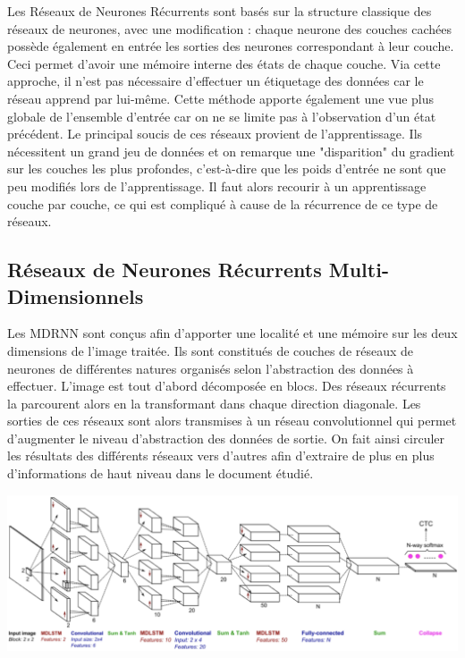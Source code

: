 Les Réseaux de Neurones Récurrents sont basés sur la structure classique des réseaux de neurones,
avec une modification : chaque neurone des couches cachées possède également en entrée les sorties
des neurones correspondant à leur couche. Ceci permet d'avoir une mémoire interne des états de chaque couche.
Via cette approche, il n'est pas nécessaire d'effectuer un étiquetage des données car le réseau apprend
par lui-même. Cette méthode apporte également une vue plus globale de l'ensemble d'entrée car on ne se limite
pas à l'observation d'un état précédent. Le principal soucis de ces réseaux provient de l'apprentissage.
Ils nécessitent un grand jeu de données et on remarque une "disparition" du gradient sur les couches les plus
profondes, c'est-à-dire que les poids d'entrée ne sont que peu modifiés lors de l'apprentissage. Il faut alors
recourir à un apprentissage couche par couche, ce qui est compliqué à cause de la récurrence de ce type de réseaux.

\subsection{Réseaux de Neurones Récurrents Multi-Dimensionnels}

Les MDRNN sont conçus afin d'apporter une localité et une mémoire sur les deux dimensions de l'image traitée.
Ils sont constitués de couches de réseaux de neurones de différentes natures organisés selon l'abstraction des
données à effectuer. L'image est tout d'abord décomposée en blocs. Des réseaux récurrents la parcourent alors
en la transformant dans chaque direction diagonale. Les sorties de ces réseaux sont alors transmises à un
réseau convolutionnel qui permet d'augmenter le niveau d'abstraction des données de sortie. On fait ainsi
circuler les résultats des différents réseaux vers d'autres afin d'extraire de plus en plus d'informations
de haut niveau dans le document étudié.

\begin{mdframed}[frametitle={Figure 10 : Schéma de structure d'un MDRNN}, innerbottommargin=10]
\begin{center}
\includegraphics[width=0.6\linewidth]{mdrnn.png}
\end{center}
\end{mdframed}

